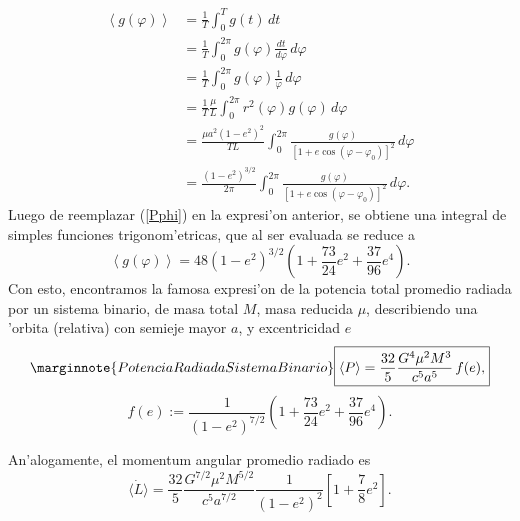 \begin{align}
\left\langle g(\varphi)\right\rangle &= \frac{1}{T}\int_0^T g(t)\,dt \\
&= \frac{1}{T}\int_0^{2\pi} g(\varphi)\frac{dt}{d\varphi}\,d\varphi \\
&= \frac{1}{T}\int_0^{2\pi} g(\varphi)\frac{1}{\dot{\varphi}}\,d\varphi \\
&= \frac{1}{T}\frac{\mu}{L}\int_0^{2\pi} r^2(\varphi)g(\varphi)\,d\varphi \\
&= \frac{\mu a^2(1-e^2)^2}{TL}\int_0^{2\pi} \frac{g(\varphi)}{\left[1+e\cos(\varphi-\varphi_0)\right]^2}\,d\varphi \\
&= \frac{(1-e^2)^{3/2}}{2\pi}\int_0^{2\pi} \frac{g(\varphi)}{\left[1+e\cos(\varphi-\varphi_0)\right]^2}\,d\varphi.
\end{align}
Luego de reemplazar (\ref{Pphi}) en la expresi'on anterior, se obtiene una integral de simples funciones trigonom'etricas, que al ser evaluada se reduce a
\begin{equation}
\left\langle g(\varphi)\right\rangle= 48(1-e^2)^{3/2}\left(1+\frac{73}{24}e^2+\frac{37}{96}e^4\right).
\end{equation}
Con esto, encontramos la famosa expresi'on de la potencia total promedio radiada por un sistema binario, de masa total $M$, masa reducida $\mu$, describiendo una 'orbita (relativa) con semieje mayor $a$, y excentricidad $e$ \cite{PM63}
\begin{equation}\label{PSbin}\marginnote{Potencia Radiada Sistema Binario}
\boxed{\left\langle P\right\rangle =\frac{32}{5}\frac{G^4\mu^2M^3}{c^5a^5}\,f(e),}
\end{equation}
\begin{equation}
\boxed{f(e):=\frac{1}{\left(1-e^2\right)^{7/2}}\left(1+\frac{73}{24}e^2+\frac{37}{96}e^4\right).}
\end{equation}

An'alogamente, el momentum angular promedio radiado es
\begin{equation}
\boxed{\langle\dot{L}\rangle=\frac{32}{5}\frac{G^{7/2}\mu^{2}M^{5/2}}{c^5a^{7/2}}\frac{1}{(1-e^{2})^{2}}\left[1+\displaystyle\frac{7}{8}e^{2}\right].}
\end{equation}

